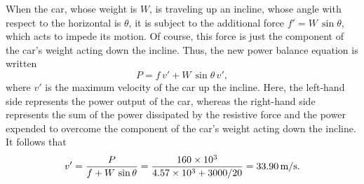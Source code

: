 When the car, whose weight is $W$, is traveling up an incline, whose angle with respect
to the horizontal is $\theta$, it is subject to the additional
force $f'= W\,\sin\theta$, which acts to impede its motion. 
Of course, this force is
just the component of the car's weight acting down the incline. Thus, the
new power balance equation is written
$$
P = f\,v' + W\,\sin\theta\,v',
$$
where $v'$ is the maximum velocity of the car up the incline. Here, the
left-hand side represents the power output of the car, whereas the right-hand
side represents the sum of the  power dissipated by the resistive force and the power expended to
overcome the component of the car's weight acting down the incline. It follows that
$$
v' = \frac{P}{f+W\,\sin\theta} = \frac{160\times 10^3}{4.57\times 10^3 + 3000/20} = 33.90\,{\rm m/s}.
$$
\begin{figure*}
\epsfysize=1.5in
\centerline{}
\end{figure*}
